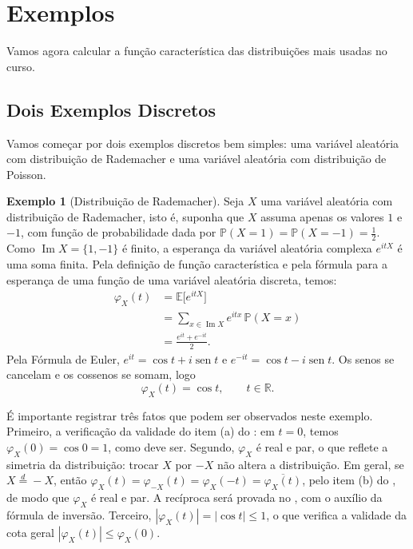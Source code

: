 \documentclass[12pt,portuguese]{article}
\theoremstyle{definition}
\newtheorem{example}[example]{Exemplo}
\theoremstyle{plainexercise}
\theoremstyle{starredexercise}
\theoremstyle{definition}
\renewcommand{\sin}{\operatorname{sen}}
\begin{document}
\section{Exemplos}\label{sec:exemplos}

Vamos agora calcular a função característica das distribuições mais usadas no
curso. 

\subsection{Dois Exemplos Discretos}\label{subsec:exemplos-discretos}

Vamos começar por dois exemplos discretos bem simples: uma variável aleatória
com distribuição de Rademacher e uma variável aleatória com distribuição de
Poisson. 

\begin{example}[Distribuição de Rademacher]\label{ex:rademacher}
Seja $X$ uma variável aleatória com distribuição de Rademacher, isto é, suponha
que $X$ assuma apenas os valores $1$ e $-1$, com função de probabilidade dada por 
$\mathbb{P}(X=1)=\mathbb{P}(X=-1)=\tfrac12$. Como
$\operatorname{Im}X=\{1,-1\}$ é finito, a esperança da variável aleatória
complexa $e^{itX}$ é uma soma finita. Pela definição de função característica e
pela fórmula para a esperança de uma função de uma variável aleatória discreta, temos:
\begin{align*}
\varphi_X(t)
&= \mathbb{E}\bigl[e^{itX}\bigr]
\\[0.3cm]
&= \sum_{x\in\operatorname{Im}X} e^{itx}\,\mathbb{P}(X=x)
\\[0.3cm]
&= \frac{e^{it}+e^{-it}}{2}.
\end{align*}
Pela Fórmula de Euler, $e^{it}=\cos t+i\sin t$ e
$e^{-it}=\cos t-i\sin t$. Os senos se cancelam e os cossenos se somam, logo
\[
\varphi_X(t)=\cos t, \qquad t\in\mathbb{R}.
\]

É importante registrar três fatos que podem ser observados neste exemplo. 
Primeiro, a verificação da validade do item (a) do
: em $t=0$, temos $\varphi_X(0)=\cos 0=1$, como deve
ser. Segundo, $\varphi_X$ é real e par, o que reflete a simetria da distribuição:
trocar $X$ por $-X$ não altera a distribuição. Em geral, se
$X\overset{d}{=}-X$, então
$\varphi_X(t)=\varphi_{-X}(t)=\varphi_X(-t)=\overline{\varphi_X(t)}$,
pelo item (b) do , de modo que $\varphi_X$ é real e
par. A recíproca será provada no , com o auxílio da fórmula
de inversão.
Terceiro, $|\varphi_X(t)|=|\cos t|\leqslant 1$, o que verifica a validade da cota geral
$|\varphi_X(t)|\leqslant\varphi_X(0)$.
\end{example}
\end{document}
